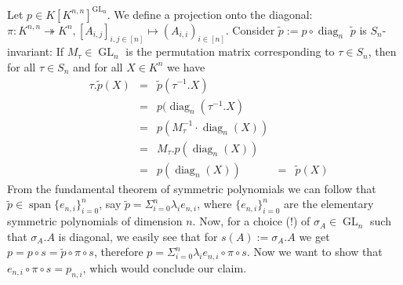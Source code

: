 \begin{example}
  Let $p \in K[K^{n,n}]^{\operatorname{GL_n}}$.
  We define a projection onto the diagonal:
  $\pi \colon K^{n,n} \twoheadrightarrow K^n , [A_{i,j}]_{i,j \in [n]} \longmapsto (A_{i,i})_{i \in [n]} $.
  Consider $\tilde{p} := p \circ \operatorname{diag}_n$
  $\tilde{p}$ is $S_n$-invariant:
  If $M_\tau \in \operatorname{GL}_n$ is the permutation matrix corresponding to $\tau \in S_n$, then for all $\tau \in S_n$ and for all $ X \in K^n$ we have
  \begin{equation}
    \begin{aligned}
      &\tau.\tilde{p} (X) &=& \tilde{p} (\tau^{-1}.X)\\
      &&=& p ( \operatorname{diag}_n(\tau^{-1}.X)\\
      &&=& p( M_\tau^{-1} \cdot \operatorname{diag}_n (X))\\
      &&=& M_\tau . p (\operatorname{diag}_n(X))\\
      &&=& p (\operatorname{diag}_n(X))&=& \tilde{p} (X)
    \end{aligned}
  \end{equation}
  From the fundamental theorem of symmetric polynomials we can follow that $\tilde{p} \in \operatorname{span}\{e_{n,i}\}_{i=0}^n$, say $\tilde{p} = \Sigma_{i=0}^n \lambda_i e_{n,i}$, where $\{ e_{n,i} \}_{i=0}^n$ are the elementary symmetric polynomials of dimension $n$.
  Now, for a choice (!) of $\sigma_A \in \operatorname{GL}_n$ such that $\sigma_A . A$ is diagonal, we easily see that for $s(A) := \sigma_A . A$ we get $p = p \circ s = \tilde{p} \circ \pi \circ s$, therefore $p = \Sigma_{i=0}^n \lambda_i e_{n,i} \circ \pi \circ s$.
  Now we want to show that $e_{n,i} \circ \pi \circ s = p_{n,i}$, which would conclude our claim.

\end{example}
